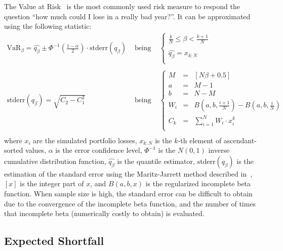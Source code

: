 \documentclass[11pt,fleqn]{book} %
\begin{document}
The Value at Risk~\cite{var:jorion} is the most commonly 
used risk measure to respond the question ``how much could I lose in a 
really bad year?''. It can be approximated using the following statistic:
\begin{displaymath}
	\begin{array}{lcl}
		\textrm{VaR}_{\beta} = \widehat{q_{\beta}} \pm \Phi^{-1}\left(\frac{1-\alpha}{2}\right) \cdot \textrm{stderr}(q_{\beta})
		& \text{ being } &
		\left\{
		\begin{array}{l}
			\displaystyle
			\frac{k}{N} \leq \beta < \frac{k+1}{N} \\
			\\
			\displaystyle
			\widehat{q_{\beta}} = x_{k:N} \\
		\end{array}
		\right.
		\\
		& &
		\\
		\textrm{stderr}(q_{\beta}) = \sqrt{C_2 - C_1^2}
		& \text{ being } &
		\left\{
		\begin{array}{rcl}
			M   & = & [N \beta + 0.5]  \\
			a   & = & M - 1            \\
			b   & = & N - M            \\
			W_i & = & B(a,b,\frac{i+1}{N}) - B(a,b,\frac{i}{N}) \\
			C_k & = & \sum_{i=1}^{N} W_i \cdot x_i^k \\
		\end{array}
		\right.
		\\
	\end{array}
\end{displaymath}
where $x_i$ are the simulated portfolio losses, $x_{k:N}$ is the $k$-th 
element of ascendant-sorted values, $\alpha$ is the error confidence level, 
$\Phi^{-1}$ is the $N(0,1)$ inverse cumulative distribution function, 
$\widehat{q_{\beta}}$ is the quantile estimator, $\textrm{stderr}(q_{\beta})$ 
is the estimation of the standard error using the Maritz-Jarrett method 
described in~\cite[chap. 3.5.3]{wilcox:2004}, $[x]$ is the integer part of 
$x$, and $B(a,b,x)$ is the regularized incomplete beta function.
When sample size is high, the standard error can be difficult to obtain due 
to the convergence of the incomplete beta function, and the number of times 
that incomplete beta (numerically costly to obtain) is evaluated.

\subsection{Expected Shortfall}
\end{document}
